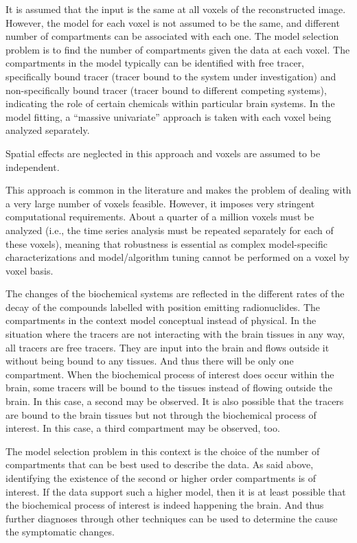 It is assumed that the input is the same at all voxels of the reconstructed image. However, the model for each voxel is not assumed to be the same, and different number of compartments can be associated with each one. The model selection problem is to find the number of compartments given the data at each voxel. The compartments in the model typically can be identified with free tracer, specifically bound tracer (tracer bound to the system under investigation) and non-specifically bound tracer (tracer bound to different competing systems), indicating the role of certain chemicals within particular brain systems. In the model fitting, a ``massive univariate'' approach is taken with each voxel being analyzed separately.
\begin{draftpar}
Spatial effects are neglected in this approach and voxels are assumed to be independent.
\end{draftpar}%
This approach is common in the literature and makes the problem of dealing with a very large number of voxels feasible. However, it imposes very stringent computational requirements. About a quarter of a million voxels must be analyzed (i.e., the time series analysis must be repeated separately for each of these voxels), meaning that robustness is essential as complex model-specific characterizations and model/algorithm tuning cannot be performed on a voxel by voxel basis.

\begin{draftpar}
The changes of the biochemical systems are reflected in the different rates of the decay of  the compounds labelled with position emitting radionuclides. The compartments in the context  \pet {} model  conceptual instead of physical. In the situation where the tracers are not interacting with the brain tissues in any way, all tracers are free tracers. They are input into the brain and flows outside it without being bound to any tissues. And thus there will be only one compartment. When the biochemical process of interest does occur within the brain, some tracers will be bound to the tissues instead of flowing outside the brain. In this case, a second  may be observed. It is also possible that the tracers are bound to the brain tissues but not through the biochemical process of interest. In this case, a third compartment may be observed, too.

The model selection problem in this context is the choice of the number of compartments that can be best used to describe the data. As said above, identifying the existence of the second or higher order compartments is of interest. If the data support such a higher model, then it is at least possible that the biochemical process of interest is indeed happening  the brain. And thus further diagnoses through other techniques can be used to determine the cause the symptomatic changes.
\end{draftpar}

